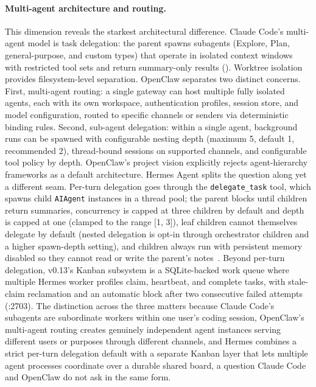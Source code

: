 \paragraph{Multi-agent architecture and routing.}
This dimension reveals the starkest architectural difference. Claude Code's multi-agent model is task delegation: the parent spawns subagents (Explore, Plan, general-purpose, and custom types) that operate in isolated context windows with restricted tool sets and return summary-only results (). Worktree isolation provides filesystem-level separation. OpenClaw separates two distinct concerns. First, multi-agent routing: a single gateway can host multiple fully isolated agents, each with its own workspace, authentication profiles, session store, and model configuration, routed to specific channels or senders via deterministic binding rules. Second, sub-agent delegation: within a single agent, background runs can be spawned with configurable nesting depth (maximum 5, default 1, recommended 2), thread-bound sessions on supported channels, and configurable tool policy by depth. OpenClaw's project vision explicitly rejects agent-hierarchy frameworks as a default architecture. Hermes Agent splits the question along yet a different seam. Per-turn delegation goes through the \texttt{delegate\_task} tool, which spawns child \texttt{AIAgent} instances in a thread pool; the parent blocks until children return summaries, concurrency is capped at three children by default and depth is capped at one (clamped to the range [1, 3]), leaf children cannot themselves delegate by default (nested delegation is opt-in through orchestrator children and a higher spawn-depth setting), and children always run with persistent memory disabled so they cannot read or write the parent's notes~\tierB{}. Beyond per-turn delegation, v0.13's Kanban subsystem is a SQLite-backed work queue where multiple Hermes worker profiles claim, heartbeat, and complete tasks, with stale-claim reclamation and an automatic block after two consecutive failed attempts (:2703). The distinction across the three matters because Claude Code's subagents are subordinate workers within one user's coding session, OpenClaw's multi-agent routing creates genuinely independent agent instances serving different users or purposes through different channels, and Hermes combines a strict per-turn delegation default with a separate Kanban layer that lets multiple agent processes coordinate over a durable shared board, a question Claude Code and OpenClaw do not ask in the same form.

